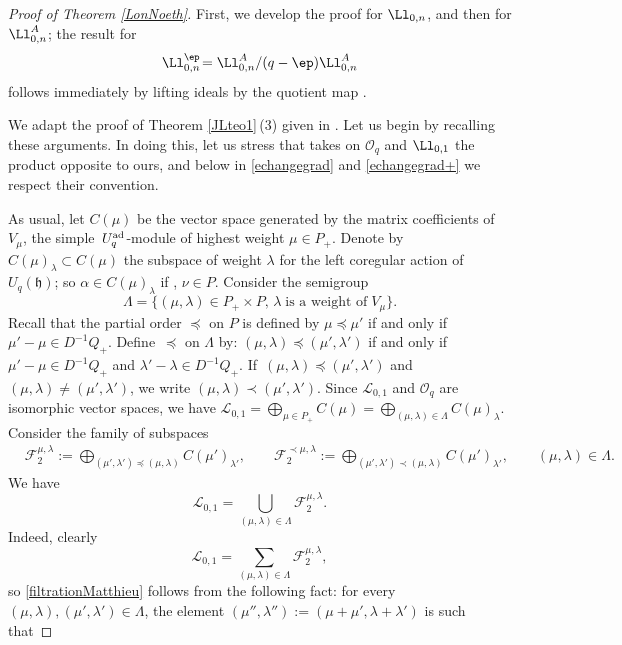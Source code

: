 \begin{proof}[Proof of Theorem \ref{LonNoeth}] First, we develop the proof for $\Ll_{0,n}$, and then for $\Ll_{0,n}^A$; the result for%
\[\Ll_{0,n}^\ep\!= \Ll_{0,n}^A/(q-\ep)\Ll_{0,n}^A
\]
 follows immediately by lifting ideals by the quotient map .

We adapt the proof of Theorem \ref{JLteo1}\,(3) given in \cite[Theorem 3.137]{VY}. Let us begin by recalling these arguments. In doing this, let us stress that \cite{VY} takes on ${\mathcal O}_q$ and $\Ll_{0,1}$ the product opposite to ours, and below in \eqref{echangegrad} and \eqref{echangegrad+} we respect their convention.

As usual, let $C(\mu)$ be the vector space generated by the matrix coefficients of $V_\mu$, the simple~$U_q^{\rm ad}$-module of highest weight $\mu \in P_+$. Denote by $C(\mu)_\lambda \subset C(\mu)$ the subspace of weight $\lambda$ for the left coregular action of $U_q({\mathfrak h})$; so $\alpha\in C(\mu)_\lambda$ if , $\nu\in P$. Consider the semigroup
\[\Lambda=\{(\mu, \lambda)\in P_+\times P, \, \lambda \;\text{is a weight of}\;V_\mu\}.\]
Recall that the partial order $\preceq$ on $P$ is defined by $\mu\preceq \mu'$ if and only if $\mu'-\mu\in D^{-1}Q_+$. Define~$\preceq$ on $\Lambda$ by: $(\mu,\lambda)\preceq (\mu', \lambda')$ if and only if $\mu'-\mu\in D^{-1}Q_+$ and $\lambda'-\lambda\in D^{-1}Q_+$. If~${(\mu,\lambda)\preceq (\mu', \lambda')}$ and $(\mu,\lambda)\ne (\mu', \lambda')$, we write $(\mu,\lambda)\prec (\mu', \lambda')$. Since ${\mathcal L}_{0,1}$ and ${\mathcal O}_q$ are isomorphic vector spaces, we have $ {\mathcal L}_{0,1}=\bigoplus_{\mu\in P_+} C(\mu)=\bigoplus_{(\mu,\lambda)\in \Lambda} C(\mu)_\lambda$. Consider the family of subspaces
\begin{align*}
& {\mathcal F}_2^{\mu,\lambda} :=\bigoplus_{(\mu',\lambda')\preceq (\mu,\lambda)} C(\mu')_{\lambda'} , \qquad{\mathcal F}_2^{\prec \mu,\lambda}:=\bigoplus_{(\mu',\lambda')\prec (\mu,\lambda)} C(\mu')_{\lambda'} , \qquad (\mu,\lambda)\in \Lambda.
\end{align*}
We have
\begin{equation}\label{filtrationMatthieu}
{\mathcal L}_{0,1} = \bigcup_{(\mu,\lambda)\in \Lambda} {\mathcal F}_2^{\mu,\lambda}.
\end{equation}
Indeed, clearly
\[ {\mathcal L}_{0,1} = \sum_{(\mu,\lambda)\in \Lambda} {\mathcal F}_2^{\mu,\lambda},
\]
 so \eqref{filtrationMatthieu} follows from the following fact: for every $(\mu,\lambda), (\mu',\lambda')\in \Lambda$, the element $(\mu'',\lambda''):= (\mu+\mu',\lambda+\lambda')$ is such that

\end{proof}

